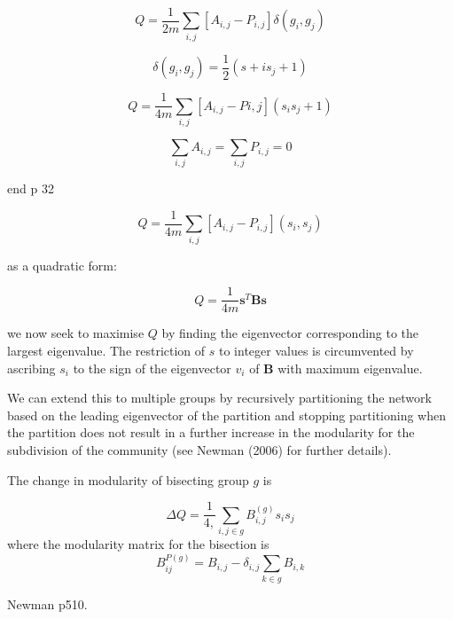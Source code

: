 \begin{equation}
Q = \frac{1}{2m}\sum_{i,j}[A_{i,j}-P_{i,j}]\delta (g_i,g_j)	
\end{equation}

\begin{equation}
\delta(g_i,g_j)	= \frac{1}{2}(s+i s_j + 1)
\end{equation}

\begin{equation}
	Q = \frac{1}{4m}\sum_{i,j}[A_{i,j}-P{i,j}](s_i s_j + 1)
\end{equation}

\begin{equation}
\sum_{i,j} A_{i,j}=\sum_{i,j}P_{i,j}=0
\end{equation}

end p 32

\begin{equation}
Q = \frac{1}{4m}\sum_{i,j}[A_{i,j}-P_{i,j}](s_i,s_j)	
\end{equation}

as a quadratic form:

\begin{equation}
	Q = \frac{1}{4m}\mathbf{s}^T\mathbf{Bs}
\end{equation}

we now seek to maximise $Q$ by finding the eigenvector corresponding to the largest eigenvalue. The restriction of $s$ to integer values is circumvented by ascribing $s_i$ to the sign of the eigenvector $v_i$
of $\mathbf{B}$ with maximum eigenvalue.

We can extend this to multiple groups by recursively partitioning the network based on the leading eigenvector of the partition and stopping partitioning when the partition does not result in a further increase in the modularity for the subdivision of the community (see Newman (2006) for further details).

The change in modularity of bisecting group $g$ is 

\begin{equation}
    \Delta Q = \frac{1}{4,} \sum_{i,j \in g} B_{i,j}^{(g)}s_i s_j
\end{equation}
where the modularity matrix for the bisection is 
\begin{equation}
B_{ij}^{P(g)} = B_{i,j} - \delta_{i,j}\sum_{k \in g} B_{i,k}  
\end{equation}
\label{eq:Change in modularity spectral clustering}

Newman \cite{newman2018networks} p510.

